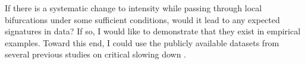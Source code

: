 
If there is a systematic change to intensity while passing through local bifurcations under some sufficient conditions, would it lead to any expected signatures in data? If so, I would like to demonstrate that they exist in empirical examples. Toward this end, I could use the publicly available datasets from several previous studies on critical slowing down \cite{dakosSlowingEarlyWarning2008a, hennekamEarlyWarningSignalsMarine2020, pavithranEffectRateChange2021, brettDynamicalFootprintsEnable2020}. 

%
%
%
%
%
%
%

